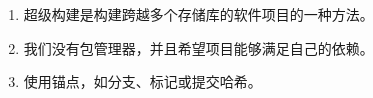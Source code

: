 

\begin{enumerate}
\item 
超级构建是构建跨越多个存储库的软件项目的一种方法。

\item
我们没有包管理器，并且希望项目能够满足自己的依赖。

\item 
使用锚点，如分支、标记或提交哈希。
\end{enumerate}